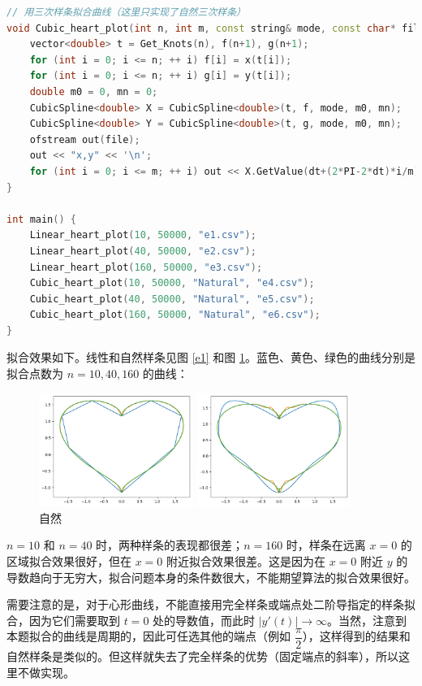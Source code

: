 \documentclass{ctexart}
\begin{document}
\begin{lstlisting}[language={c++}]
// 用三次样条拟合曲线（这里只实现了自然三次样条）
void Cubic_heart_plot(int n, int m, const string& mode, const char* file) {
	vector<double> t = Get_Knots(n), f(n+1), g(n+1);
	for (int i = 0; i <= n; ++ i) f[i] = x(t[i]);
	for (int i = 0; i <= n; ++ i) g[i] = y(t[i]);
	double m0 = 0, mn = 0;
	CubicSpline<double> X = CubicSpline<double>(t, f, mode, m0, mn);
	CubicSpline<double> Y = CubicSpline<double>(t, g, mode, m0, mn);
	ofstream out(file);
	out << "x,y" << '\n';
	for (int i = 0; i <= m; ++ i) out << X.GetValue(dt+(2*PI-2*dt)*i/m) << ',' << Y.GetValue(dt+(2*PI-2*dt)*i/m) << '\n';
}

int main() {
	Linear_heart_plot(10, 50000, "e1.csv");
	Linear_heart_plot(40, 50000, "e2.csv");
	Linear_heart_plot(160, 50000, "e3.csv");
	Cubic_heart_plot(10, 50000, "Natural", "e4.csv");
	Cubic_heart_plot(40, 50000, "Natural", "e5.csv");
	Cubic_heart_plot(160, 50000, "Natural", "e6.csv");
}
\end{lstlisting}

拟合效果如下。线性和自然样条见图 \ref{e1} 和图 \ref{e2}。蓝色、黄色、绿色的曲线分别是拟合点数为 $n=10,40,160$ 的曲线：

\begin{figure}[htbp]
\centering
\begin{minipage}{5cm}
    \centering
    \includegraphics[width=5cm]{e1.png}
    \caption{线性}
    \label{e1}
\end{minipage}
\qquad
\begin{minipage}{5cm}
    \centering
    \includegraphics[width=5cm]{e2.png}
    \caption{自然}
    \label{e2}
\end{minipage}
\end{figure}

$n=10$ 和 $n=40$ 时，两种样条的表现都很差；$n=160$ 时，样条在远离 $x=0$ 的区域拟合效果很好，但在 $x=0$ 附近拟合效果很差。这是因为在 $x=0$ 附近 $y$ 的导数趋向于无穷大，拟合问题本身的条件数很大，不能期望算法的拟合效果很好。

需要注意的是，对于心形曲线，不能直接用完全样条或端点处二阶导指定的样条拟合，因为它们需要取到 $t=0$ 处的导数值，而此时 $|y'(t)|\rightarrow \infty$。当然，注意到本题拟合的曲线是周期的，因此可任选其他的端点（例如 $\dfrac \pi 2$），这样得到的结果和自然样条是类似的。但这样就失去了完全样条的优势（固定端点的斜率），所以这里不做实现。
\end{document}
